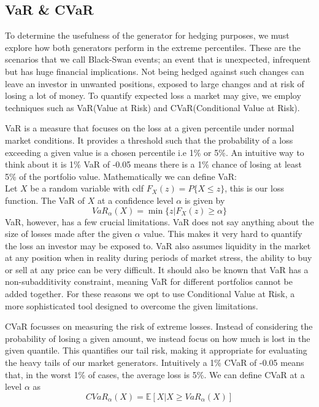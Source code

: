 \documentclass[12pt]{article}
\newcommand{\newp}
    {
    \vskip 0.5cm 
  }
\numberwithin{equation}{section}
\begin{document}
\newpage
\subsection{VaR \& CVaR}
To determine the usefulness of the generator for hedging purposes, we must explore 
how both generators perform in the extreme percentiles. These are the scenarios 
that we call Black-Swan events; an event that is unexpected, infrequent but has 
huge financial implications. Not being hedged against such changes can leave an 
investor in unwanted positions, exposed to large changes and at risk of losing 
a lot of money. To quantify expected loss a market may give, we employ techniques 
such as VaR(Value at Risk) and CVaR(Conditional Value at Risk). 
\newp 
VaR is a measure that focuses on the loss at a given percentile under normal 
market conditions. It provides a threshold such that the probability of a loss 
exceeding a given value is a chosen percentile i.e 1\% or 5\%. An intuitive 
way to think about it is 1\% VaR of -0.05 means there is a 1\% chance of 
losing at least 5\% of the portfolio value. Mathematically we can define VaR:\\ 
Let $X$ be a random variable with cdf $F_{X}(z)=P\{X\leq z\}$, this is our loss function. 
The VaR of $X$ at a confidence level $\alpha$ is given by
\begin{equation}
  VaR_\alpha(X) = \min\{z|F_X(z)\geq \alpha\}
\end{equation}
VaR, however, has a few crucial limitations. VaR does not say anything about the 
size of losses made after the given $\alpha$ value. This makes it very hard to 
quantify the loss an investor may be exposed to. VaR also assumes liquidity in 
the market at any position when in reality during periods of market stress, the 
ability to buy or sell at any price can be very difficult. It should also be 
known that VaR has a non-subadditivity constraint, meaning VaR for different portfolios 
cannot be added together. For these reasons we opt to use Conditional Value at 
Risk, a more sophisticated tool designed to overcome the given limitations. 
\newp 
CVaR focusses on measuring the risk of extreme losses. Instead of 
considering the probability of losing a given amount, we instead focus on how 
much is lost in the given quantile. This quantifies our tail risk, making it 
appropriate for evaluating the heavy tails of our market generators. Intuitively 
a 1\% CVaR of -0.05 means that, in the worst 1\% of cases, the average loss is 5\%. 
We can define CVaR at a level $\alpha$ as 
\begin{equation}
  CVaR_{\alpha}(X) = \mathbb{E}[X | X \geq VaR_{\alpha}(X)]
\end{equation}
\end{document}
